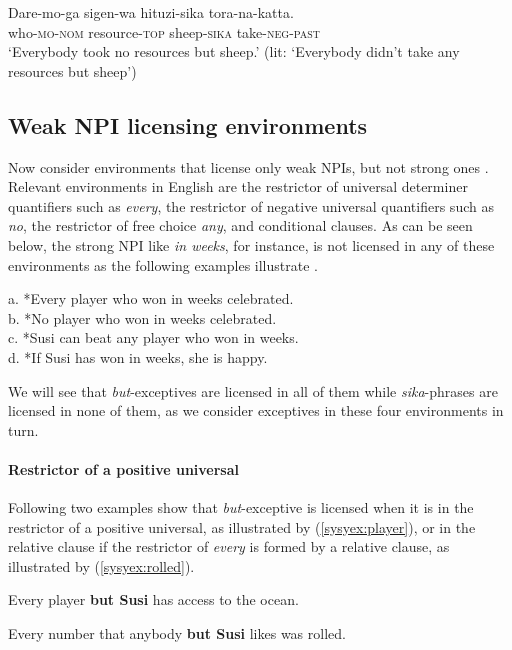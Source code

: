 \documentclass[output=paper,colorlinks,citecolor=brown,
]{langscibook}
\def\refp#1{(\ref{sy#1})}
\def\M#1{\textsc{#1}}
\begin{document}
\ea \label{syex:daremoga}
\gll Dare-mo-ga sigen-wa hituzi-sika tora-na-katta.\\
who-\M{mo}-\M{nom} resource-\M{top} sheep-\M{sika} take-\M{neg-past}\\
\glt `Everybody took no resources but sheep.' (lit: `Everybody didn't take any resources but sheep')\z



\subsection{Weak NPI licensing environments}

Now consider environments that license only weak NPIs, but not strong ones \citep{zwarts98a,gajewski11a}.
Relevant environments in English are the restrictor of universal determiner quantifiers such as \emph{every}, the restrictor of negative universal quantifiers such as \emph{no}, the restrictor of free choice \emph{any}, and conditional clauses.  
As can be seen below, the strong NPI like \emph{in weeks}, for instance, is not licensed in any of these environments as the following examples illustrate \citep{hoeksema05m}.

\ea a. *Every player who won in weeks celebrated.\\
    b. *No player who won in weeks celebrated.\\
    c. *Susi can beat any player who won in weeks.\\
    d. *If Susi has won in weeks, she is happy.\z

We will see that \emph{but}-exceptives are licensed in all of them while \emph{sika}-phrases are licensed in none of them, as we consider exceptives in these four environments in turn.

\paragraph{Restrictor of a positive universal} 
Following two examples show that \emph{but}-exceptive is licensed when it is in the restrictor of a positive universal, as illustrated by \refp{syex:player}, or in the relative clause if the restrictor of \emph{every} is formed by a relative clause, as illustrated by \refp{syex:rolled}.

\ea \label{syex:player} 
   Every player \textbf{but Susi} has access to the ocean.\z

\ea \label{syex:rolled}
    Every number that anybody \textbf{but Susi} likes was rolled.\z
\end{document}
